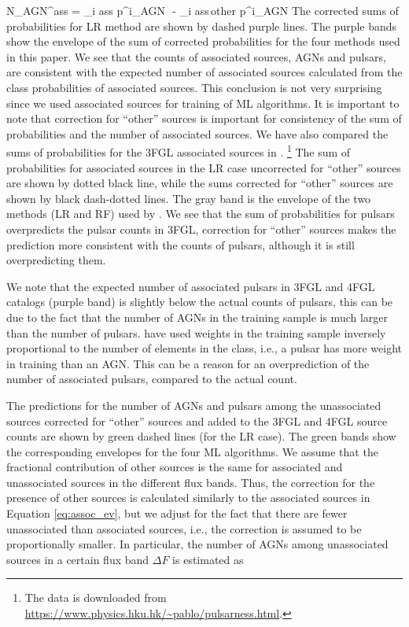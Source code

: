 \be
{}
N_{\rm AGN}^{\rm ass}  = \sum_{i \in \rm ass} p^i_{\rm AGN}\,\, - \sum_{i \in \rm ass\,other} p^i_{\rm AGN}
\ee
The corrected sums of probabilities for LR method are shown by dashed purple lines.
The purple bands show the envelope of the sum of corrected probabilities for the four methods used in this paper.
We see that the counts of associated sources, AGNs and pulsars, are consistent with the expected number of associated sources
calculated from the class probabilities of associated sources.
This conclusion is not very surprising since we used associated sources for training of ML algorithms.
It is important to note that correction for ``other'' sources is important for consistency of the sum of probabilities and the number of associated sources.
We have also compared the sums of probabilities for the 3FGL associated sources in \cite{2016ApJ...820....8S}.%
\footnote{The data is downloaded from \url{https://www.physics.hku.hk/~pablo/pulsarness.html}.}
The sum of probabilities for associated sources in the LR case uncorrected for ``other'' sources are shown by dotted black line,
while the sums corrected for ``other'' sources are shown by black dash-dotted lines.
The gray band is the envelope of the two methods (LR and RF) used by \cite{2016ApJ...820....8S}.
We see that the sum of probabilities for pulsars overpredicts the pulsar counts in 3FGL, correction for ``other'' sources makes the prediction 
more consistent with the counts of pulsars, although it is still overpredicting them.

We note that the expected number of associated pulsars in 3FGL and 4FGL catalogs (purple band) is slightly below the 
actual counts of pulsars, this can be due to the fact that the number of AGNs in the training sample is much larger than the number of pulsars.
\cite{2016ApJ...820....8S} have used weights in the training sample inversely proportional to the number of elements in the class,
i.e., a pulsar has more weight in training than an AGN.
This can be a reason for an overprediction of the number of associated pulsars, compared to the actual count.


The predictions for the number of AGNs and pulsars among the unassociated sources corrected for ``other'' sources and 
added to the 3FGL and 4FGL source counts are shown by green dashed lines (for the LR case).
The green bands show the corresponding envelopes for the four ML algorithms.
We assume that the fractional contribution of other sources is the same for associated and unassociated sources in the different flux bands.
Thus, the correction for the presence of other sources is calculated similarly to the associated sources in Equation \ref{eq:assoc_ev},
but we adjust for the fact that there are fewer unassociated than associated sources, i.e., 
the correction is assumed to be proportionally smaller.
In particular, the number of AGNs among unassociated sources in a certain flux band $\Delta F$ is estimated as

